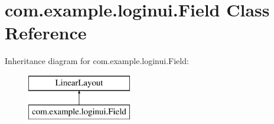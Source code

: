 \hypertarget{classcom_1_1example_1_1loginui_1_1_field}{\section{com.\+example.\+loginui.\+Field Class Reference}
\label{classcom_1_1example_1_1loginui_1_1_field}
}
Inheritance diagram for com.\+example.\+loginui.\+Field\+:\begin{figure}[H]
\begin{center}
\leavevmode
\includegraphics[height=2.000000cm]{classcom_1_1example_1_1loginui_1_1_field}
\end{center}
\end{figure}
